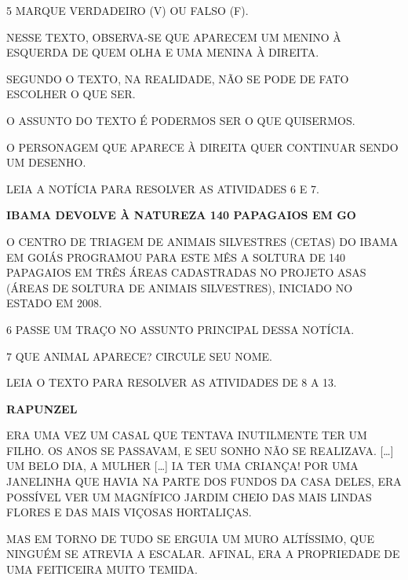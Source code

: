 \num{5} MARQUE VERDADEIRO (V) OU FALSO (F).

\begin{boxlist}
 NESSE TEXTO, OBSERVA-SE QUE APARECEM UM MENINO À ESQUERDA DE QUEM OLHA E UMA MENINA À DIREITA.

 SEGUNDO O TEXTO, NA REALIDADE, NÃO SE PODE DE FATO ESCOLHER O QUE SER.

 O ASSUNTO DO TEXTO É PODERMOS SER O QUE QUISERMOS.

 O PERSONAGEM QUE APARECE À DIREITA QUER CONTINUAR SENDO UM DESENHO.
\end{boxlist}

LEIA A NOTÍCIA PARA RESOLVER AS ATIVIDADES 6 E 7.

\begin{myquote}
\textbf{IBAMA DEVOLVE À NATUREZA 140 PAPAGAIOS EM GO}

O CENTRO DE TRIAGEM DE ANIMAIS SILVESTRES
(CETAS) DO IBAMA EM GOIÁS PROGRAMOU PARA ESTE MÊS A SOLTURA DE 140
PAPAGAIOS EM TRÊS ÁREAS CADASTRADAS NO PROJETO ASAS (ÁREAS DE SOLTURA
DE ANIMAIS SILVESTRES), INICIADO NO ESTADO EM 2008.~

\end{myquote}

\num{6} PASSE UM TRAÇO NO ASSUNTO PRINCIPAL DESSA NOTÍCIA.

\vspace{0.5cm}

\num{7} QUE ANIMAL APARECE? CIRCULE SEU NOME. 

\vspace{0.5cm}

LEIA O TEXTO PARA RESOLVER AS ATIVIDADES DE 8 A 13.

\begin{myquote}
\textbf{RAPUNZEL}

ERA UMA VEZ UM CASAL QUE TENTAVA INUTILMENTE TER UM
FILHO. OS ANOS SE PASSAVAM, E SEU SONHO NÃO SE REALIZAVA. [\ldots{}] UM
BELO DIA, A MULHER [\ldots{}] IA TER UMA
CRIANÇA! POR UMA JANELINHA QUE HAVIA NA PARTE DOS FUNDOS DA CASA DELES,
ERA POSSÍVEL VER UM MAGNÍFICO JARDIM CHEIO DAS MAIS
LINDAS FLORES E DAS MAIS VIÇOSAS HORTALIÇAS.

MAS EM TORNO DE TUDO SE ERGUIA UM MURO ALTÍSSIMO, QUE NINGUÉM SE ATREVIA
A ESCALAR. AFINAL, ERA A PROPRIEDADE DE UMA FEITICEIRA MUITO TEMIDA.

\end{myquote}


